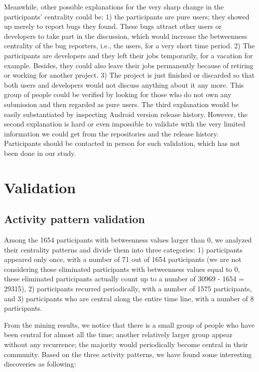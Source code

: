 \documentclass[10pt, conference, compsocconf]{IEEEtran}
\begin{document}
Meanwhile, other possible explanations for the very sharp change in the participants' centrality could be: 1) the participants are pure users; they showed up merely to report bugs they found. These bugs attract other users or developers to take part in the discussion, which would increase the betweenness centrality of the bug reporters, i.e., the users, for a very short time period. 2) The participants are developers and they left their jobs temporarily, for a vacation for example. Besides, they could also leave their jobs permanently because of retiring or working for another project. 3) The project is just finished or discarded so that both users and developers would not discuss anything about it any more. This group of people could be verified by looking for those who do not own any submission and then regarded as pure users. The third explanation would be easily substantiated by inspecting Android version release history. However, the second explanation is hard or even impossible to validate with the very limited information we could get from the repositories and the release history. Participants should be contacted in person for such validation, which has not been done in our study.



\section{Validation}
\label{validation}
\subsection{Activity pattern validation}
Among the 1654 participants with betweenness values larger than 0, we analyzed their centrality patterns and divide them into three categories: 
1) participants appeared only once, with a number of 71 out of 1654 participants (we are not considering those eliminated participants with betweenness values equal to 0, these eliminated participants actually count up to a number of 30969 - 1654 = 29315), 
2) participants recurred periodically, with a number of 1575 participants,
and 3) participants who are central along the entire time line, with a number of 8 participants.

From the mining results, we notice that there is a small group of people who have been central for almost all the time; another relatively larger group appear without any recurrence; the majority would periodically become central in their community. Based on the three activity patterns, we have found some interesting discoveries as following:
\end{document}
